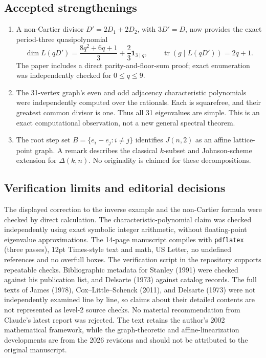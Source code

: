 \documentclass[12pt,letterpaper]{article}
\begin{document}
\subsection*{Accepted strengthenings}
\begin{enumerate}
\item A non-Cartier divisor $D'=2D_1+2D_2$, with $3D'=D$, now provides
the exact period-three quasipolynomial
\[
\dim L(qD')=\frac{8q^2+6q+1}{3}+\frac23\mathbf1_{3\mid q},
\qquad \operatorname{tr}(g\mid L(qD'))=2q+1.
\]
The paper includes a direct parity-and-floor-sum proof; exact enumeration
was independently checked for $0\leq q\leq9$.
\item The 31-vertex graph's even and odd adjacency characteristic
polynomials were independently computed over the rationals.
Each is squarefree, and their greatest common divisor is one.
Thus all 31 eigenvalues are simple. This is an exact computational
observation, not a new general spectral theorem.
\item The root step set $B=\{e_i-e_j:i\ne j\}$ identifies $J(n,2)$
as an affine lattice-point graph. A remark describes the classical
$k$-subset and Johnson-scheme extension for $\Delta(k,n)$.
No originality is claimed for these decompositions.
\end{enumerate}

\subsection*{Verification limits and editorial decisions}
The displayed correction to the inverse example and the non-Cartier
formula were checked by direct calculation. The characteristic-polynomial
claim was checked independently using exact symbolic integer arithmetic,
without floating-point eigenvalue approximations.
The 14-page manuscript compiles with \texttt{pdflatex} (three passes),
12pt Times-style text and math, US Letter, no undefined references
and no overfull boxes. The verification script in the repository
supports repeatable checks. Bibliographic metadata for Stanley (1991)
were checked against his publication list, and Delsarte (1973) against
catalog records. The full texts of James (1978), Cox--Little--Schenck (2011),
and Delsarte (1973) were not independently examined line by line, so claims
about their detailed contents are not represented as level-2 source checks.
No material recommendation from Claude's latest report was rejected.
The text retains the author's 2002 mathematical framework, while the
graph-theoretic and affine-linearization developments are from the 2026
revisions and should not be attributed to the original manuscript.
\end{document}
